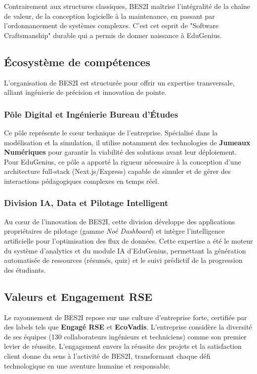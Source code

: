 Contrairement aux structures classiques, BES2I maîtrise l'intégralité de la chaîne de valeur, de la conception logicielle à la maintenance, en passant par l'ordonnancement de systèmes complexes. C'est cet esprit de "Software Craftsmanship" durable qui a permis de donner naissance à EduGenius.

\subsection{Écosystème de compétences}
L’organisation de BES2I est structurée pour offrir un expertise transversale, alliant ingénierie de précision et innovation de pointe.

\subsubsection{Pôle Digital et Ingénierie Bureau d’Études}
Ce pôle représente le cœur technique de l'entreprise. Spécialisé dans la modélisation et la simulation, il utilise notamment des technologies de \textbf{Jumeaux Numériques} pour garantir la viabilité des solutions avant leur déploiement. Pour EduGenius, ce pôle a apporté la rigueur nécessaire à la conception d'une architecture full-stack (Next.js/Express) capable de simuler et de gérer des interactions pédagogiques complexes en temps réel.

\subsubsection{Division IA, Data et Pilotage Intelligent}
Au cœur de l'innovation de BES2I, cette division développe des applications propriétaires de pilotage (gamme \textit{Noé Dashboard}) et intègre l'intelligence artificielle pour l'optimisation des flux de données. Cette expertise a été le moteur du système d'analytics et du module IA d'EduGenius, permettant la génération automatisée de ressources (résumés, quiz) et le suivi prédictif de la progression des étudiants.

\subsection{Valeurs et Engagement RSE}
Le rayonnement de BES2I repose sur une culture d'entreprise forte, certifiée par des labels tels que \textbf{Engagé RSE} et \textbf{EcoVadis}. L'entreprise considère la diversité de ses équipes (130 collaborateurs ingénieurs et techniciens) comme son premier levier de réussite. L'engagement envers la réussite des projets et la satisfaction client donne du sens à l'activité de BES2I, transformant chaque défi technologique en une aventure humaine et responsable.

